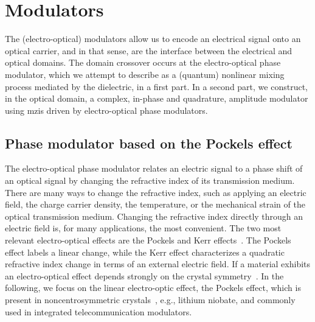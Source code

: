 \section{Modulators}

The (electro-optical) modulators allow us to encode an electrical signal onto an optical carrier, and in that sense, are the interface between the electrical and optical domains.
The domain crossover occurs at the electro-optical phase modulator, which we attempt to describe as a (quantum) nonlinear mixing process mediated by the dielectric, in a first part.
In a second part, we construct, in the optical domain, a complex, in-phase and quadrature, amplitude modulator using \gls{mzi}s driven by electro-optical phase modulators.

\subsection{Phase modulator based on the Pockels effect}

The electro-optical phase modulator relates an electric signal to a phase shift of an optical signal by changing the refractive index of its transmission medium.
There are many ways to change the refractive index, such as applying an electric field, the charge carrier density, the temperature, or the mechanical strain of the optical transmission medium.
Changing the refractive index directly through an electric field is, for many applications, the most convenient.
The two most relevant electro-optical effects are the Pockels and Kerr effects~\cite[Ch.~18]{Saleh2007}.
The Pockels effect labels a linear change, while the Kerr effect characterizes a quadratic refractive index change in terms of an external electric field.
If a material exhibits an electro-optical effect depends strongly on the crystal symmetry~\cite[p.~237]{Yariv1984}.
In the following, we focus on the linear electro-optic effect, the Pockels effect, which is present in noncentrosymmetric crystals~\cite[p.~2]{Boyd2020}, e.g., lithium niobate, and commonly used in integrated telecommunication modulators.

